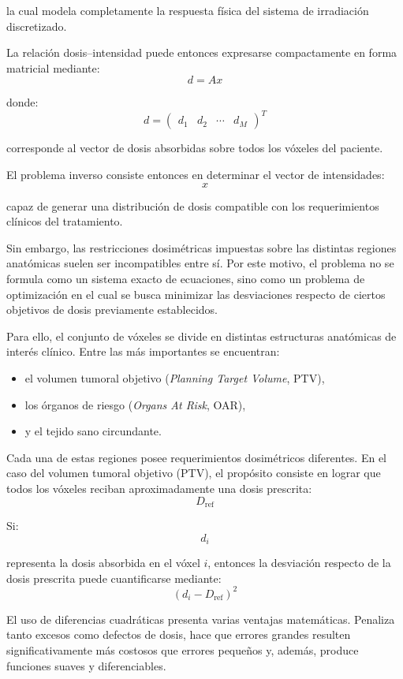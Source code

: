 la cual modela completamente la respuesta física del sistema de irradiación discretizado.

La relación dosis--intensidad puede entonces expresarse compactamente en forma matricial mediante:
\[
d=Ax
\]

donde:
\[
d=
\begin{pmatrix}
d_1 & d_2 & \cdots & d_M
\end{pmatrix}^T
\]

corresponde al vector de dosis absorbidas sobre todos los vóxeles del paciente.

El problema inverso consiste entonces en determinar el vector de intensidades:
\[
x
\]

capaz de generar una distribución de dosis compatible con los requerimientos clínicos del tratamiento.

Sin embargo, las restricciones dosimétricas impuestas sobre las distintas regiones anatómicas suelen ser incompatibles entre sí. Por este motivo, el problema no se formula como un sistema exacto de ecuaciones, sino como un problema de optimización en el cual se busca minimizar las desviaciones respecto de ciertos objetivos de dosis previamente establecidos.

Para ello, el conjunto de vóxeles se divide en distintas estructuras anatómicas de interés clínico. Entre las más importantes se encuentran:

\begin{itemize}
    \item el volumen tumoral objetivo (\textit{Planning Target Volume}, PTV),
    \item los órganos de riesgo (\textit{Organs At Risk}, OAR),
    \item y el tejido sano circundante.
\end{itemize}

Cada una de estas regiones posee requerimientos dosimétricos diferentes. En el caso del volumen tumoral objetivo (PTV), el propósito consiste en lograr que todos los vóxeles reciban aproximadamente una dosis prescrita:
\[
D_{\text{ref}}
\]

Si:
\[
d_i
\]

representa la dosis absorbida en el vóxel \(i\), entonces la desviación respecto de la dosis prescrita puede cuantificarse mediante:
\[
(d_i-D_{\text{ref}})^2
\]

El uso de diferencias cuadráticas presenta varias ventajas matemáticas. Penaliza tanto excesos como defectos de dosis, hace que errores grandes resulten significativamente más costosos que errores pequeños y, además, produce funciones suaves y diferenciables.

